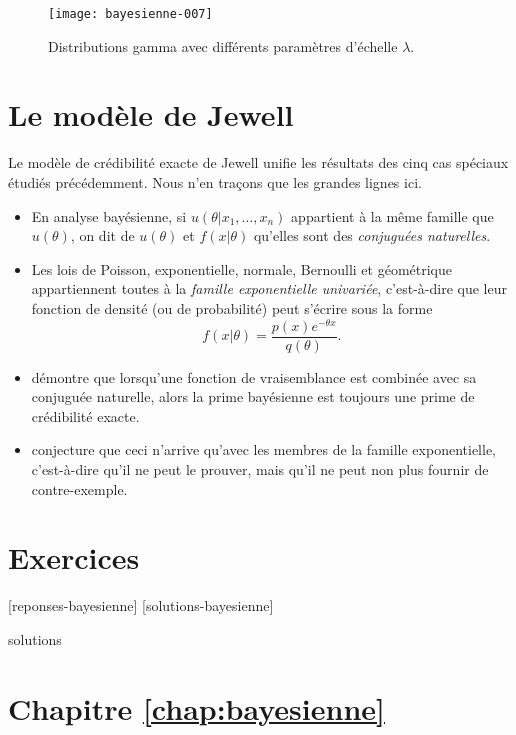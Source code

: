 \begin{figure}
  \centering
\texttt{[image: bayesienne-007]}
   \caption{Distributions gamma avec différents paramètres d'échelle
     $\lambda$.}
   \label{fig:bayesienne:gamma}
\end{figure}


\section{Le modèle de Jewell}
\label{sec:bayesienne:jewell}

Le modèle de crédibilité exacte de Jewell unifie les résultats des
cinq cas spéciaux étudiés précédemment. Nous n'en traçons que les
grandes lignes ici.

\begin{itemize}
\item En analyse bayésienne, si $u(\theta|x_1, \dots, x_n)$ appartient
  à la même famille que $u(\theta)$, on dit de $u(\theta)$ et
  $f(x|\theta)$ qu'elles sont des \emph{conjuguées naturelles}.
\item Les lois de Poisson, exponentielle, normale, Bernoulli et
  géométrique appartiennent toutes à la \emph{famille exponentielle
    univariée}, c'est-à-dire que leur fonction de densité (ou de
  probabilité) peut s'écrire sous la forme
  \begin{equation*}
    f(x|\theta) = \frac{p(x) e^{-\theta x}}{q(\theta)}.
  \end{equation*}
\item \citet{Jewell:exact:1974} démontre que lorsqu'une fonction de
  vraisemblance est combinée avec sa conjuguée naturelle, alors la
  prime bayésienne est toujours une prime de crédibilité exacte.
\item \citet{Goel:conjecture:1982} conjecture que ceci n'arrive
  qu'avec les membres de la famille exponentielle, c'est-à-dire qu'il
  ne peut le prouver, mais qu'il ne peut non plus fournir de
  contre-exemple.
\end{itemize}


\section{Exercices}
\label{sec:bayesienne:exercices}

[reponses-bayesienne]
[solutions-bayesienne]

\begin{Filesave}{solutions}
\section*{Chapitre \ref*{chap:bayesienne}}

\end{Filesave}

